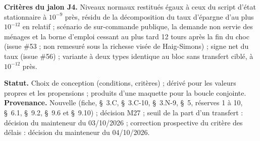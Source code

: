 \documentclass[11pt,a4paper]{article}
\begin{document}
\begin{proposee}
\textbf{Critères du jalon J4.} Niveaux normaux restitués égaux à ceux du script d'état stationnaire à $10^{-9}$ près, résidu de la décomposition du taux d'épargne d'au plus $10^{-12}$ en relatif ; scénario de sur-commande publique, la demande non servie des ménages et la borne d'emploi cessant au plus tard 12 tours après la fin du choc (issue \#53 ; non remesuré sous la richesse visée de Haig-Simons) ; signe net du taux (issue \#56) ; variante à deux types identique au bloc sans transfert ciblé, à $10^{-12}$ près.

\textbf{Statut.} Choix de conception (conditions, critères) ; dérivé pour les valeurs propres et les propensions ; produits d'une maquette pour la boucle conjointe. \textbf{Provenance.} Nouvelle (fiche, \S~3.C, \S~3.C-10, \S~3.N-9, \S~5, réserves 1 à 10, \S~6.1, \S~9.2, \S~9.6 et \S~9.10) ; décision M27 ; seuil de la part d'un transfert : décision du mainteneur du 03/10/2026 ; correction prospective du critère des délais : décision du mainteneur du 04/10/2026.
\end{proposee}
\end{document}
